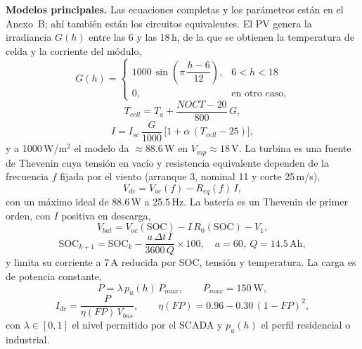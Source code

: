 \documentclass[conference]{IEEEtran}
\begin{document}
\textbf{Modelos principales.} Las ecuaciones completas y los parámetros están en el Anexo~B; ahí también están los circuitos equivalentes. El PV genera la irradiancia $G(h)$ entre las 6 y las 18\,h, de la que se obtienen la temperatura de celda y la corriente del módulo,
\begin{equation}
\label{eq:G}
G(h)=\begin{cases}
1000\,\sin\!\left(\pi\,\dfrac{h-6}{12}\right), & 6<h<18\\[4pt]
0, & \text{en otro caso,}
\end{cases}
\end{equation}
\begin{equation}
\label{eq:Tcell}
T_{cell}=T_a+\frac{NOCT-20}{800}\,G,
\end{equation}
\begin{equation}
\label{eq:Ipv}
I=I_{sc}\,\frac{G}{1000}\,\big[1+\alpha\,(T_{cell}-25)\big],
\end{equation}
y a 1000\,W/m$^2$ el modelo da $\approx$88.6\,W en $V_{mp}\approx18$\,V. La turbina es una fuente de Thevenin cuya tensión en vacío y resistencia equivalente dependen de la frecuencia $f$ fijada por el viento (arranque 3, nominal 11 y corte 25\,m/s),
\begin{equation}
\label{eq:Vdc}
V_{dc}=V_{oc}(f)-R_{eq}(f)\,I,
\end{equation}
con un máximo ideal de 88.6\,W a 25.5\,Hz. La batería es un Thevenin de primer orden, con $I$ positiva en descarga,
\begin{equation}
\label{eq:Vbat}
V_{bat}=V_{oc}(\mathrm{SOC})-I\,R_0(\mathrm{SOC})-V_1,
\end{equation}
\begin{equation}
\label{eq:SOC}
\mathrm{SOC}_{k+1}=\mathrm{SOC}_k-\frac{a\,\Delta t\,I}{3600\,Q}\times100,\quad a=60,\ Q=14.5\,\mathrm{Ah},
\end{equation}
y limita su corriente a 7\,A reducida por SOC, tensión y temperatura. La carga es de potencia constante,
\begin{equation}
\label{eq:Pcarga}
P=\lambda\,p_u(h)\,P_{max},\qquad P_{max}=150\ \text{W},
\end{equation}
\begin{equation}
\label{eq:Idc}
I_{dc}=\frac{P}{\eta(FP)\,V_{bus}},\qquad \eta(FP)=0.96-0.30\,(1-FP)^2,
\end{equation}
con $\lambda\in[0,1]$ el nivel permitido por el SCADA y $p_u(h)$ el perfil residencial o industrial.
\end{document}
